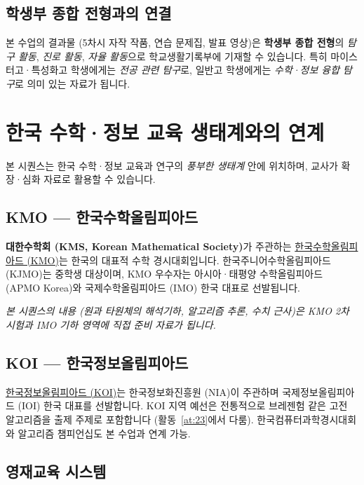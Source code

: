 \documentclass[12pt,a4paper]{scrartcl}
\newcommand{\acc}[1]{\textcolor{accent}{\textbf{#1}}}
\begin{document}
\subsection{학생부 종합 전형과의 연결}

본 수업의 결과물 (5차시 자작 작품, 연습 문제집, 발표 영상)은 \acc{학생부 종합 전형}의 \emph{탐구 활동}, \emph{진로 활동}, \emph{자율 활동}으로 학교생활기록부에 기재할 수 있습니다. 특히 마이스터고·특성화고 학생에게는 \emph{전공 관련 탐구}로, 일반고 학생에게는 \emph{수학·정보 융합 탐구}로 의미 있는 자료가 됩니다.

\section{한국 수학·정보 교육 생태계와의 연계}\label{sec:olympiad}

본 시퀀스는 한국 수학·정보 교육과 연구의 \emph{풍부한 생태계} 안에 위치하며, 교사가 확장·심화 자료로 활용할 수 있습니다.

\subsection{KMO --- 한국수학올림피아드}

\acc{대한수학회 (KMS, Korean Mathematical Society)}가 주관하는 \href{https://www.kmo.or.kr/}{한국수학올림피아드 (KMO)}는 한국의 대표적 수학 경시대회입니다. 한국주니어수학올림피아드 (KJMO)는 중학생 대상이며, KMO 우수자는 아시아·태평양 수학올림피아드 (APMO Korea)와 국제수학올림피아드 (IMO) 한국 대표로 선발됩니다.

\emph{본 시퀀스의 내용 (원과 타원체의 해석기하, 알고리즘 추론, 수치 근사)은 KMO 2차 시험과 IMO 기하 영역에 직접 준비 자료가 됩니다.}

\subsection{KOI --- 한국정보올림피아드}

\href{https://www.digitalculture.or.kr/koi/}{한국정보올림피아드 (KOI)}는 한국정보화진흥원 (NIA)이 주관하며 국제정보올림피아드 (IOI) 한국 대표를 선발합니다. KOI 지역 예선은 전통적으로 브레젠험 같은 고전 알고리즘을 출제 주제로 포함합니다 (활동~\ref{at:23}에서 다룸). 한국컴퓨터과학경시대회와 알고리즘 챔피언십도 본 수업과 연계 가능.

\subsection{영재교육 시스템}
\end{document}
